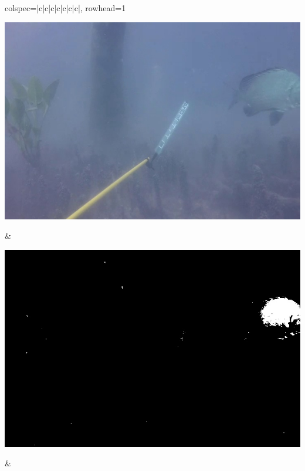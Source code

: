 \begin{longtblr}[
            caption = {Hasil ujicoba proses \textit{background subtraction} menggunakan GMM terhadap video indeks 9986},
            label = {tab:gmm_9986}
        ]{
            colspec={|c|c|c|c|c|c|c|},
            rowhead=1
        }
\begin{minipage}{0.24\textwidth}
                \includegraphics[width=\linewidth]{image/9866/9866_original_frame849.jpg}
            \end{minipage} &
            \begin{minipage}{0.24\textwidth}
                \includegraphics[width=\linewidth]{image/9866/9866_gmm_frame849.jpg}
            \end{minipage} &
            \begin{minipage}{0.24\textwidth}

\end{minipage}
\end{longtblr}
